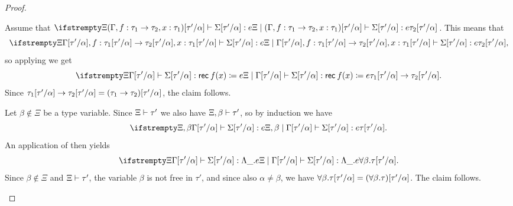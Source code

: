 \begin{proof}
\begin{proofsec}
    \item[\ruleref{Trec}]
    Assume that $\typerel{\Xi}{(\Gamma, \hastype{f}{\typeFunc{\tau_1}{\tau_2}}, \hastype{x}{\tau_1})[\tau'/\alpha]}{\Sigma[\tau'/\alpha]}{e}{\tau_2[\tau'/\alpha]}$. This means that
    \begin{equation*}
        \typerel{\Xi}{\Gamma[\tau'/\alpha], \hastype{f}{\typeFunc{\tau_1[\tau'/\alpha]}{\tau_2[\tau'/\alpha]}}, \hastype{x}{\tau_1[\tau'/\alpha]}}{\Sigma[\tau'/\alpha]}{e}{\tau_2[\tau'/\alpha]},
    \end{equation*}
    so applying  we get
    \begin{equation*}
        \typerel{\Xi}{\Gamma[\tau'/\alpha]}{\Sigma[\tau'/\alpha]}{\expRec{f}{x}{e}}{\typeFunc{\tau_1[\tau'/\alpha]}{\tau_2[\tau'/\alpha]}}.
    \end{equation*}
    Since $\typeFunc{\tau_1[\tau'/\alpha]}{\tau_2[\tau'/\alpha]} = \typeFunc*{\tau_1}{\tau_2}[\tau'/\alpha]$, the claim follows.

    \item[\ruleref{TTlam}]
    Let $\beta \not\in \Xi$ be a type variable. Since $\Xi \vdash \tau'$ we also have $\Xi,\beta \vdash \tau'$, so by induction we have
    \begin{equation*}
        \typerel{\Xi,\beta}{\Gamma[\tau'/\alpha]}{\Sigma[\tau'/\alpha]}{e}{\tau[\tau'/\alpha]}.
    \end{equation*}
    An application of  then yields
    \begin{equation*}
        \typerel{\Xi}{\Gamma[\tau'/\alpha]}{\Sigma[\tau'/\alpha]}{\expForall{\beta}{e}}{\typeForall{\beta}{\tau[\tau'/\alpha]}}.
    \end{equation*}
    Since $\beta \not\in \Xi$ and $\Xi \vdash \tau'$, the variable $\beta$ is not free in $\tau'$, and since also $\alpha \neq \beta$, we have $\typeForall{\beta}{\tau[\tau'/\alpha]} = \typeForall*{\beta}{\tau}[\tau'/\alpha]$. The claim follows.


\end{proofsec}
\end{proof}
